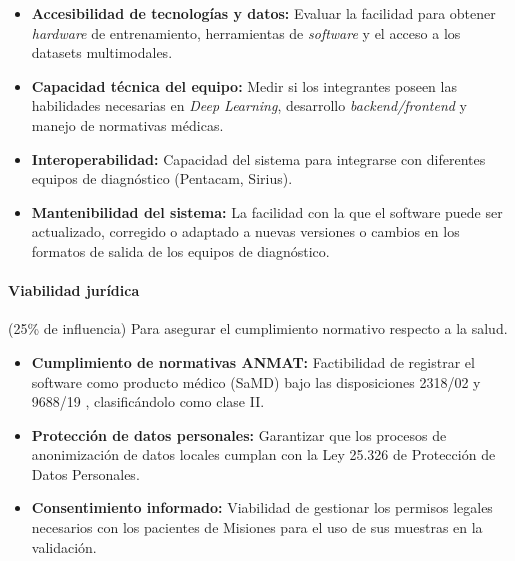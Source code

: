             \begin{itemize}
                \item \textbf{Accesibilidad de tecnologías y datos:} Evaluar la facilidad para obtener \textit{hardware} de entrenamiento, herramientas de \textit{software} y el acceso a los datasets multimodales.
        
                \item \textbf{Capacidad técnica del equipo:} Medir si los integrantes poseen las habilidades necesarias en \textit{Deep Learning}, desarrollo \textit{backend/frontend} y manejo de normativas médicas.
        
                \item \textbf{Interoperabilidad:} Capacidad del sistema para integrarse con diferentes equipos de diagnóstico (Pentacam, Sirius).
        
                \item \textbf{Mantenibilidad del sistema:} La facilidad con la que el software puede ser actualizado, corregido o adaptado a nuevas versiones o cambios en los formatos de salida de los equipos de diagnóstico.
            \end{itemize}
        
            \paragraph{Viabilidad jurídica} (25\% de influencia) Para asegurar el cumplimiento normativo respecto a la salud.
        
            \begin{itemize}
                \item \textbf{Cumplimiento de normativas ANMAT:} Factibilidad de registrar el software como producto médico (SaMD) bajo las disposiciones 2318/02  y 9688/19 , clasificándolo como clase II.  
                
                \item \textbf{Protección de datos personales:} Garantizar que los procesos de anonimización de datos locales cumplan con la Ley 25.326  de Protección de Datos Personales.  
                
                \item \textbf{Consentimiento informado:} Viabilidad de gestionar los permisos legales necesarios con los pacientes de Misiones para el uso de sus muestras en la validación.
            \end{itemize}

